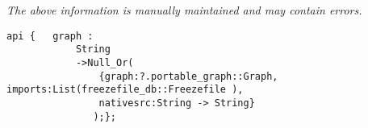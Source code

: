 \label{pkg:graph}

{\tiny \it The above information is manually maintained and may contain errors.}
\begin{verbatim}
api {   graph :
            String
            ->Null_Or(
                {graph:?.portable_graph::Graph, imports:List(freezefile_db::Freezefile ),
                nativesrc:String -> String}
               );};
\end{verbatim}
